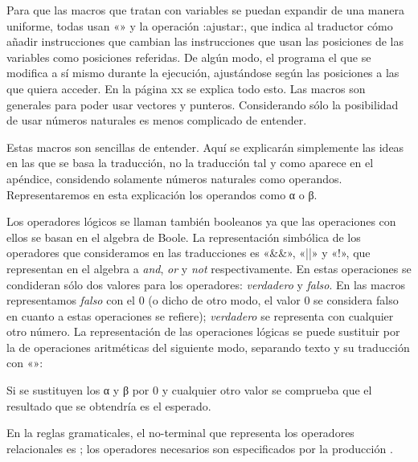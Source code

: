 Para que las macros que tratan con variables se puedan expandir de una manera uniforme, todas
usan «» y la operación {\fcode:ajustar:}, que indica al traductor cómo añadir
instrucciones que cambian las instrucciones que usan las posiciones de las variables como posiciones
referidas. De algún modo, el programa el que se modifica a sí mismo durante la ejecución,
ajustándose según las posiciones a las que quiera acceder. En la página xx se explica todo esto. Las
macros son generales para poder usar vectores y punteros. Considerando sólo la posibilidad de usar
números naturales es menos complicado de entender.

Estas macros son sencillas de entender. Aquí se explicarán simplemente las ideas en las que se basa
la traducción, no la traducción tal y como aparece en el apéndice, considendo solamente números
naturales como operandos. Representaremos en esta explicación los operandos como {\fgramatnoterm α}
o {\fgramatnoterm β}.

Los operadores lógicos se llaman también booleanos ya que las operaciones con ellos se basan en el
algebra de Boole. La representación simbólica de los operadores que consideramos en las traducciones
es «\&\&», «||» y «!», que representan en el algebra a {\it and}, {\it or} y {\it not}
respectivamente. En estas operaciones se condideran sólo dos valores para los operadores: {\it
verdadero} y {\it falso}. En las macros representamos {\it falso} con el 0 (o dicho de otro modo, el
valor 0 se considera falso en cuanto a estas operaciones se refiere); {\it verdadero} se representa
con cualquier otro número. La representación de las operaciones lógicas se puede sustituir por la de
operaciones aritméticas del siguiente modo, separando texto y su traducción con «\flechagram{}»:
\listraducciones
\noindent{}\par
\noindent{}\par
\noindent{}
\finlistatrad
Si se sustituyen los α y β por 0 y cualquier otro valor se comprueba que el resultado que se
obtendría es el esperado.

En la reglas gramaticales, el no-terminal que representa los operadores relacionales
es ; los operadores necesarios son especificados por la producción
\encaje
{} \fin .
\finencaje

